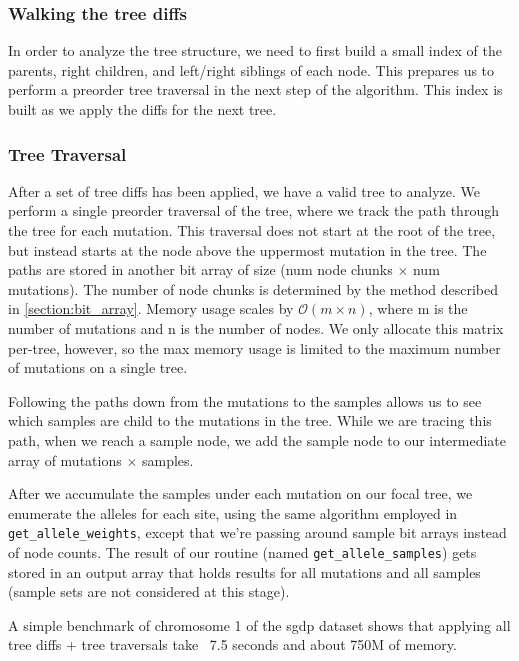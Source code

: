 \documentclass[12pt]{article}
\newcommand{\ccode}[1]{\texttt{#1}}
\begin{document}
\subsubsection{Walking the tree diffs}\label{section:node_counting}

In order to analyze the tree structure, we need to first build a small index of
the parents, right children, and left/right siblings of each node. This prepares
us to perform a preorder tree traversal in the next step of the algorithm. This
index is built as we apply the diffs for the next tree.

\subsubsection{Tree Traversal}

After a set of tree diffs has been applied, we have a valid tree to analyze. We
perform a single preorder traversal of the tree, where we track the path through
the tree for each mutation. This traversal does not start at the root of the
tree, but instead starts at the node above the uppermost mutation in the
tree. The paths are stored in another bit array of size (num node chunks
$\times$ num mutations). The number of node chunks is determined by the method
described in \ref{section:bit_array}. Memory usage scales by $\mathcal{O}(m
\times n)$, where m is the number of mutations and n is the number of nodes. We
only allocate this matrix per-tree, however, so the max memory usage is limited
to the maximum number of mutations on a single tree.

Following the paths down from the mutations to the samples allows us to see
which samples are child to the mutations in the tree. While we are tracing this
path, when we reach a sample node, we add the sample node to our intermediate
array of mutations $\times$ samples.

After we accumulate the samples under each mutation on our focal tree, we
enumerate the alleles for each site, using the same algorithm employed in
\ccode{get_allele_weights}, except that we're passing around sample bit arrays
instead of node counts. The result of our routine (named
\ccode{get_allele_samples}) gets stored in an output array that holds results
for all mutations and all samples (sample sets are not considered at this stage).

A simple benchmark of chromosome 1 of the sgdp dataset shows that applying all
tree diffs + tree traversals take ~7.5 seconds and about 750M of memory.
\end{document}
